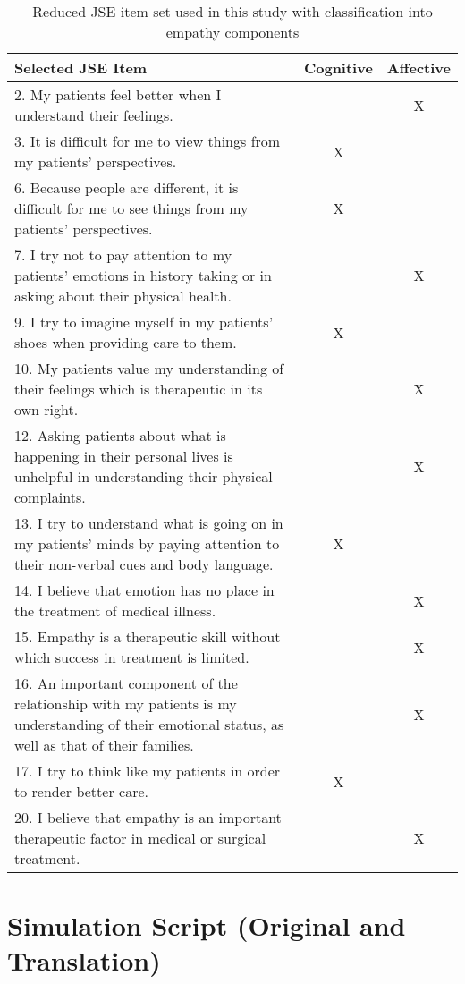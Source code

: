 \begin{table}[H]
    \centering
    \begin{tabular}{p{10.5cm}cc}
    \toprule
    \textbf{Selected JSE Item} & \textbf{Cognitive} & \textbf{Affective} \\
    \midrule
    2. My patients feel better when I understand their feelings. & & X \\
    3. It is difficult for me to view things from my patients’ perspectives. & X & \\
    6. Because people are different, it is difficult for me to see things from my patients’ perspectives. & X & \\
    7. I try not to pay attention to my patients’ emotions in history taking or in asking about their physical health. & & X \\
    9. I try to imagine myself in my patients’ shoes when providing care to them. & X & \\
    10. My patients value my understanding of their feelings which is therapeutic in its own right. & & X \\
    12. Asking patients about what is happening in their personal lives is unhelpful in understanding their physical complaints. & & X \\
    13. I try to understand what is going on in my patients’ minds by paying attention to their non-verbal cues and body language. & X & \\
    14. I believe that emotion has no place in the treatment of medical illness. & & X \\
    15. Empathy is a therapeutic skill without which success in treatment is limited. & & X \\
    16. An important component of the relationship with my patients is my understanding of their emotional status, as well as that of their families. & & X \\
    17. I try to think like my patients in order to render better care. & X & \\
    20. I believe that empathy is an important therapeutic factor in medical or surgical treatment. & & X \\
    \bottomrule
    \end{tabular}
    \caption{Reduced JSE item set used in this study with classification into empathy components}
    \label{tab:jse_shortened}
    \end{table}


    \chapter{Simulation Script (Original and Translation)}
    
